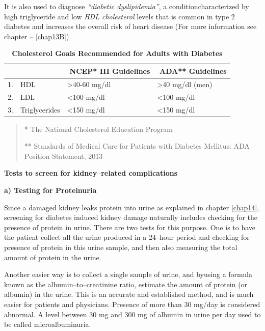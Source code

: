 It is also used to diagnose \textit{“diabetic dyslipidemia”}, a condition\break characterized by high triglyceride and low \textit{HDL cholesterol} levels that is common in type 2 diabetes and increases the overall risk of heart disease (For more information see chapter – \ref{chap13B}).

{
\begin{table}[H]
\centering
\caption*{\textbf{Cholesterol Goals Recommended for Adults with Diabetes}}
\small\addtolength{\tabcolsep}{-3pt}
\begin{tabular}{|c|l|l|l|}
\hline
 & & \,\,\textbf{NCEP* III Guidelines} & \,\,\textbf{ADA** Guidelines}\\
\hline
1. & HDL & \textgreater 40-60 mg/dl & \textgreater 40 mg/dl (men)\\
\hline
2. & LDL & \textless 100 mg/dl & \textless 100 mg/dl\\
\hline
3. & Triglycerides & \textless 150 mg/dl & \textless 150 mg/dl\\
\hline
\end{tabular}
\end{table}
\begin{quote}
* The National Cholesterol Education Program

** Standards of Medical Care for Patients with Diabetes Mellitus: ADA
Position Statement, 2013
\end{quote}
}\relax

\noindent\textbf{Tests to screen for kidney–related complications}

\textbf{a) Testing for Proteinuria}

Since a damaged kidney leaks protein into urine as explained in chapter \ref{chap14}, screening for diabetes induced kidney damage naturally includes checking for the presence of protein in urine. There are two tests for this purpose. One is to have the patient collect all the urine produced in a 24–hour period and checking for presence of protein in this urine sample, and then also measuring the total amount of protein in the urine.

Another easier way is to collect a single sample of urine, and by\break using a formula known as the albumin–to–creatinine ratio, estimate the amount of protein (or albumin) in the urine. This is an accurate and established method, and is much easier for patients and physicians. Presence of more than 30 mg/day is considered abnormal. A level between 30 mg and 300 mg of albumin in urine per day used to be called microalbuminuria.

